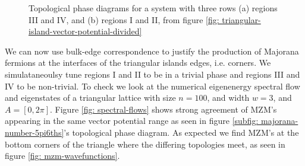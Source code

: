 \documentclass[aps,prb,showpacs,amsmath,amssymb,superscriptaddress]{revtex4-2}
\begin{document}
\begin{figure}[]
  \hfill
  \hfill
  \label{fig: majorana-number}
  \caption{Topological phase diagrams for a system with three rows (a) regions III and IV, and (b) regions I and II, from figure \ref{fig: triangular-island-vector-potential-divided}}
\end{figure}

We can now use bulk-edge correspondence to justify the production of Majorana fermions at the interfaces of the triangular islands edges, i.e. corners.
We simulataneoulsy tune regions I and II to be in a trivial phase and regions III and IV to be non-trivial.
To check we look at the numerical eigenenergy spectral flow and eigenstates of a triangular lattice with size $n=100$, and width $w=3$, and $A = [0,2\pi]$.
Figure \ref{fig: spectral-flows} shows strong agreement of MZM's appearing in the same vector potential range as seen in figure \ref{subfig: majorana-number-5pi6ths}'s topological phase diagram.
As expected we find MZM's at the bottom corners of the triangle where the differing topologies meet, as seen in figure \ref{fig: mzm-wavefunctions}.
\end{document}
